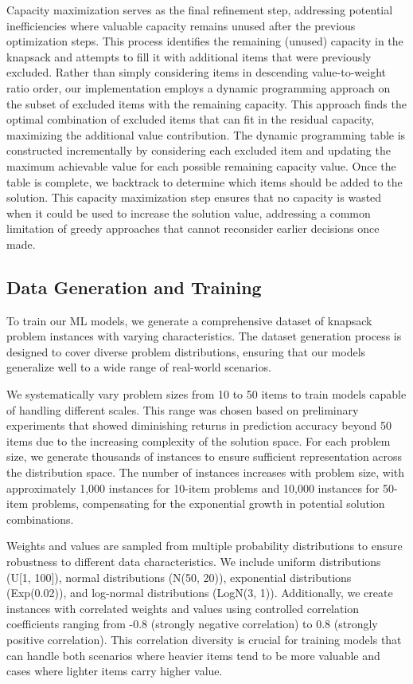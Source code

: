 \documentclass[conference, a4paper]{IEEEtran}
\begin{document}
Capacity maximization serves as the final refinement step, addressing potential inefficiencies where valuable capacity remains unused after the previous optimization steps. This process identifies the remaining (unused) capacity in the knapsack and attempts to fill it with additional items that were previously excluded. Rather than simply considering items in descending value-to-weight ratio order, our implementation employs a dynamic programming approach on the subset of excluded items with the remaining capacity. This approach finds the optimal combination of excluded items that can fit in the residual capacity, maximizing the additional value contribution. The dynamic programming table is constructed incrementally by considering each excluded item and updating the maximum achievable value for each possible remaining capacity value. Once the table is complete, we backtrack to determine which items should be added to the solution. This capacity maximization step ensures that no capacity is wasted when it could be used to increase the solution value, addressing a common limitation of greedy approaches that cannot reconsider earlier decisions once made.

\subsection{Data Generation and Training}
To train our ML models, we generate a comprehensive dataset of knapsack problem instances with varying characteristics. The dataset generation process is designed to cover diverse problem distributions, ensuring that our models generalize well to a wide range of real-world scenarios.

We systematically vary problem sizes from 10 to 50 items to train models capable of handling different scales. This range was chosen based on preliminary experiments that showed diminishing returns in prediction accuracy beyond 50 items due to the increasing complexity of the solution space. For each problem size, we generate thousands of instances to ensure sufficient representation across the distribution space. The number of instances increases with problem size, with approximately 1,000 instances for 10-item problems and 10,000 instances for 50-item problems, compensating for the exponential growth in potential solution combinations.

Weights and values are sampled from multiple probability distributions to ensure robustness to different data characteristics. We include uniform distributions (U[1, 100]), normal distributions (N(50, 20)), exponential distributions (Exp(0.02)), and log-normal distributions (LogN(3, 1)). Additionally, we create instances with correlated weights and values using controlled correlation coefficients ranging from -0.8 (strongly negative correlation) to 0.8 (strongly positive correlation). This correlation diversity is crucial for training models that can handle both scenarios where heavier items tend to be more valuable and cases where lighter items carry higher value.
\end{document}

